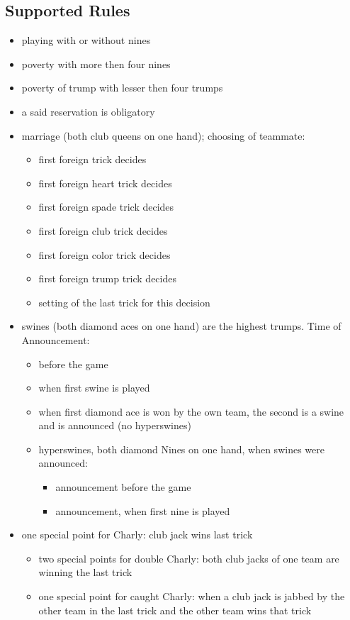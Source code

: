 \documentclass[12pt,a4paper]{article}
\begin{document}
\subsection{Supported Rules}
\begin{itemize}
\item playing with or without nines
\item poverty with more then four nines
\item poverty of trump with lesser then four trumps
\item a said reservation is obligatory
\item marriage (both club queens on one hand); choosing of teammate:
\begin{itemize}
\item first foreign trick decides
\item first foreign heart trick decides
\item first foreign spade trick decides
\item first foreign club trick decides
\item first foreign color trick decides
\item first foreign trump trick decides
\item setting of the last trick for this decision
\end{itemize}
\item swines (both diamond aces on one hand) are the highest trumps. Time of Announcement:
\begin{itemize}
\item before the game
\item when first swine is played
\item when first diamond ace is won by the own team, the second is a swine and is announced
     (no hyperswines)
\item hyperswines, both diamond Nines on one hand, when swines were announced:
\begin{itemize}
\item announcement before the game
\item announcement, when first nine is played
\end{itemize}
\end{itemize}
\item one special point for Charly: club jack wins last trick
\begin{itemize}
\item two special points for double Charly: both club jacks of one team are winning the last trick
\item one special point for caught Charly: when a club jack is jabbed by the other team in the last trick and the other team wins that trick

\end{itemize}
\end{itemize}
\end{document}

